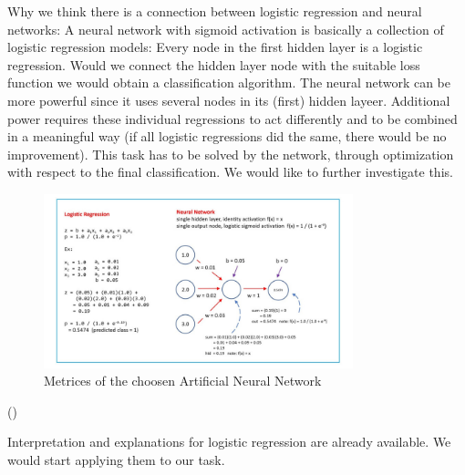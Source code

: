 \documentclass[]{article}
\begin{document}
Why we think there is a connection between logistic regression and
neural networks: A neural network with sigmoid activation is basically a
collection of logistic regression models: Every node in the first hidden
layer is a logistic regression. Would we connect the hidden layer node
with the suitable loss function we would obtain a classification
algorithm. The neural network can be more powerful since it uses several
nodes in its (first) hidden layeer. Additional power requires these
individual regressions to act differently and to be combined in a
meaningful way (if all logistic regressions did the same, there would be
no improvement). This task has to be solved by the network, through
optimization with respect to the final classification. We would like to
further investigate this.

\begin{figure}
    \centering
    \includegraphics[width=0.8\textwidth]{images/logistic_regression_and_neural_network.jpeg}
    \caption{Metrices of the choosen Artificial Neural Network}
    \label{fig:h2o_model_performance}
\end{figure}

(\cite{nn-better-logReg})

Interpretation and explanations for logistic regression are already
available. We would start applying them to our task.

\renewcommand\refname{References}

\end{document}
